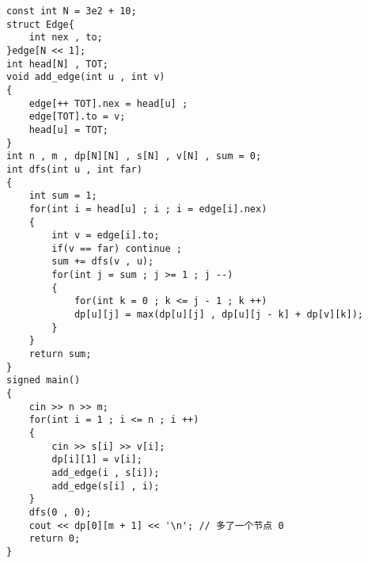 \documentclass[E:/GsjzTle/main/main.tex]{subfiles}
\begin{document}
\begin{lstlisting}
const int N = 3e2 + 10;
struct Edge{
	int nex , to;
}edge[N << 1];
int head[N] , TOT;
void add_edge(int u , int v)
{
	edge[++ TOT].nex = head[u] ;
	edge[TOT].to = v;
	head[u] = TOT;
}
int n , m , dp[N][N] , s[N] , v[N] , sum = 0;
int dfs(int u , int far)
{
	int sum = 1;
	for(int i = head[u] ; i ; i = edge[i].nex)
	{
		int v = edge[i].to;
		if(v == far) continue ;
		sum += dfs(v , u);
		for(int j = sum ; j >= 1 ; j --)
		{
			for(int k = 0 ; k <= j - 1 ; k ++) 
			dp[u][j] = max(dp[u][j] , dp[u][j - k] + dp[v][k]); 
		}
	}
	return sum;
}
signed main()
{
	cin >> n >> m;
	for(int i = 1 ; i <= n ; i ++)
	{
		cin >> s[i] >> v[i];
		dp[i][1] = v[i];
		add_edge(i , s[i]);
		add_edge(s[i] , i);
	}
	dfs(0 , 0);
	cout << dp[0][m + 1] << '\n'; // 多了一个节点 0
	return 0;
}
\end{lstlisting}
\end{document}
